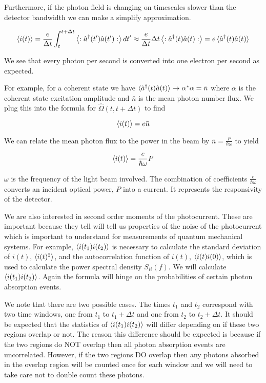 \documentclass[12pt]{article}
\begin{document}
Furthermore, if the photon field is changing on timescales slower than the detector bandwidth we can make a simplify approximation.

\begin{equation}
\braket{i(t)} = \frac{e}{\Delta t} \int_t^{t+\Delta t} \left<:\hat{a}^{\dag}(t')\hat{a}(t'):\right>dt' \approx \frac{e}{\Delta t} \Delta t \left<:\hat{a}^{\dag}(t)\hat{a}(t):\right> = e \braket{\hat{a}^{\dag}(t)\hat{a}(t)}
\end{equation}

We see that every photon per second is converted into one electron per second as expected.

For example, for a coherent state we have $\braket{\hat{a}^{\dag}(t)\hat{a}(t)}\rightarrow \alpha^* \alpha = \bar{n}$  where $\alpha$ is the coherent state excitation amplitude and $\bar{n}$ is the mean photon number flux. We plug this into the formula for $\hat{\Omega}(t,t+\Delta t)$ to find

\begin{equation}
\braket{i(t)} =  e \bar{n}
\end{equation}

We can relate the mean photon flux to the power in the beam by $\bar{n} = \frac{P}{\hbar \omega}$ to yield

\begin{equation}
\braket{i(t)} = \frac{e}{\hbar \omega} P
\end{equation}

$\omega$ is the frequency of the light beam involved. The combination of coefficients $\frac{e}{\hbar \omega}$ converts an incident optical power, $P$ into a current. It represents the responsivity of the detector.

We are also interested in second order moments of the photocurrent. These are important because they tell will tell us properties of the noise of the photocurrent which is important to understand for measurements of quantum mechanical systems. For example, $\braket{i(t_1)i(t_2)}$ is necessary to calculate the standard deviation of $i(t)$, $\braket{i(t)^2}$, and the autocorrelation function of $i(t)$, $\braket{i(t)i(0)}$, which is used to calculate the power spectral density $S_{ii}(f)$. We will calculate $\braket{i(t_1)i(t_2)}$. Again the formula will hinge on the probabilities of certain photon absorption events.

We note that there are two possible cases. The times $t_1$ and $t_2$ correspond with two time windows, one from $t_1$ to $t_1+\Delta t$ and one from $t_2$ to $t_2+\Delta t$. It should be expected that the statistics of $\braket{i(t_1)i(t_2)}$ will differ depending on if these two regions overlap or not. The reason this difference should be expected is because if the two regions do NOT overlap then all photon absorption events are uncorrelated. However, if the two regions DO overlap then any photons absorbed in the overlap region will be counted once for each window and we will need to take care not to double count these photons.
\end{document}
